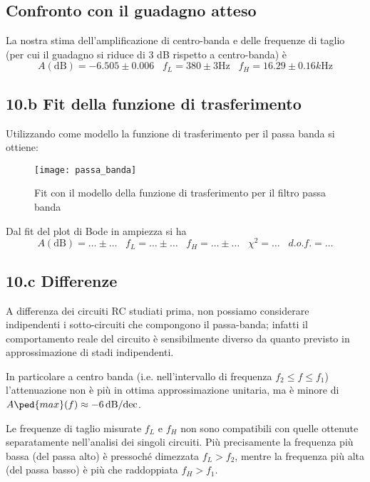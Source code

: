 \documentclass[10pt,a4paper]{article}
\begin{document}
\subsection{Confronto con il guadagno atteso}
La nostra stima dell'amplificazione di centro-banda e delle frequenze di 
taglio (per cui il guadagno si riduce di 3 dB rispetto a centro-banda) \`e
\[
A(\mathrm{dB}) = -6.505 \pm 0.006 \;\;\; f_{L} = 380 \pm 3 \si{\Hz} \;\;\;
f_{H} = 16.29 \pm 0.16 \si{k\Hz}
\]

\iffalse
\subsection*{10.b Fit della funzione di trasferimento}
Utilizzando come modello la funzione di trasferimento per il passa banda si ottiene:

\begin{figure}[htb]
\centering
\texttt{[image: passa\_banda]}
\caption{Fit con il modello della funzione di trasferimento per il filtro
passa banda}
\end{figure}


Dal fit del plot di Bode in ampiezza si ha
\[
A(\mathrm{dB}) = \ldots \pm \ldots \;\;\;f_{L} = \ldots\pm \ldots\;\;\;f_{H} = 
\ldots\pm 
\ldots\;\;\;\chi^2 = \ldots\;\;\; d.o.f.= \ldots
\]

\subsection*{10.c Differenze}
A differenza dei circuiti RC studiati prima, non possiamo considerare
indipendenti i sotto-circuiti che compongono il passa-banda; infatti il
comportamento reale del circuito è sensibilmente diverso da quanto previsto in 
approssimazione di stadi indipendenti.

In particolare a centro banda (i.e. nell'intervallo di frequenza
$f_2 \leq f \leq f_1$) l'attenuazione non è più in ottima approssimazione
unitaria, ma è minore di $A\ped{max}(f) \approx \SI{-6}{\dB/dec}$.

Le frequenze di taglio misurate $f_L$ e $f_H$ non sono compatibili con quelle
ottenute separatamente nell'analisi dei singoli circuiti. Più precisamente
la frequenza più bassa (del passa alto) è pressoché dimezzata
$f_L > f_2$, mentre la frequenza più alta (del passa basso) è più che
raddoppiata $f_H > f_1$.
\end{document}
